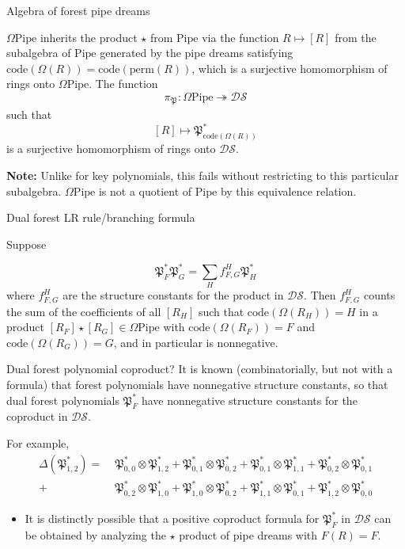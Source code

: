 \documentclass[aspectratio=169]{beamer}
\newcommand{\code}{\mathrm{code}}
\newcommand{\dcoma}{\mathcal{DS}}
\newcommand{\Forest}[1]{\mathfrak{P}_{#1}}
\newcommand{\RC}{\mathrm{Pipe}}
\begin{document}
\begin{frame}{Algebra of forest pipe dreams}
    \begin{theorem}[S, 2026+]
    $\Omega\RC$ inherits the product $\star$ from $\RC$ via the function $R\mapsto [R]$ from the subalgebra of $\RC$ generated by the pipe dreams satisfying $\code(\Omega(R))=\code(\mathrm{perm}(R))$, which is a surjective homomorphism of rings onto $\Omega\RC$. The function
    $$\pi_{\Forest{}}:\Omega\RC\twoheadrightarrow\dcoma$$
    such that
    $$[R]\mapsto \Forest{\mathrm{code}(\Omega(R))}^*$$
    is a surjective homomorphism of rings onto $\dcoma$.
    \end{theorem}
    {\textbf{Note:}} Unlike for key polynomials, this fails without restricting to this particular subalgebra. $\Omega\RC$ is not a quotient of $\RC$ by this equivalence relation.
\end{frame}

\begin{frame}{Dual forest LR rule/branching formula}
  \begin{theorem}[S, 2026+]
    Suppose
    
    $$\Forest{F}^*\Forest{G}^* = \sum_H f_{F,G}^H \Forest{H}^*$$
    where $f_{F,G}^H$ are the structure constants for the product in $\dcoma$. Then $f_{F,G}^H$ counts the sum of the coefficients of all $[R_H]$ such that $\code(\Omega(R_H))=H$ in a product $[R_F]\star [R_G]\in\Omega\RC$ with $\code(\Omega(R_F)) = F$ and $\code(\Omega(R_G)) = G$, and in particular is nonnegative.
  \end{theorem}
  
\end{frame}

\begin{frame}{Dual forest polynomial coproduct?}
  It is known (combinatorially, but not with a formula) that forest polynomials have nonnegative structure constants, so that dual forest polynomials $\Forest{F}^*$ have nonnegative structure constants for the coproduct in $\dcoma$. 
  
  For example,
  \begin{align*}
    \Delta\!\left(\Forest{1,2}^*\right) =\;
      &\Forest{0,0}^*\!\otimes\!\Forest{1,2}^*
      + \Forest{0,1}^*\!\otimes\!\Forest{0,2}^*
      + \Forest{0,1}^*\!\otimes\!\Forest{1,1}^*
      + \Forest{0,2}^*\!\otimes\!\Forest{0,1}^* \\
      +\;&\Forest{0,2}^*\!\otimes\!\Forest{1,0}^*
      + \Forest{1,0}^*\!\otimes\!\Forest{0,2}^*
      + \Forest{1,1}^*\!\otimes\!\Forest{0,1}^*
      + \Forest{1,2}^*\!\otimes\!\Forest{0,0}^*
  \end{align*}
  \begin{itemize}
  \item It is distinctly possible that a positive coproduct formula for $\Forest{F}^*$ in $\dcoma$ can be obtained by analyzing the $\star$ product of pipe dreams with $F(R) = F$.
  \end{itemize}
\end{frame}
\end{document}
